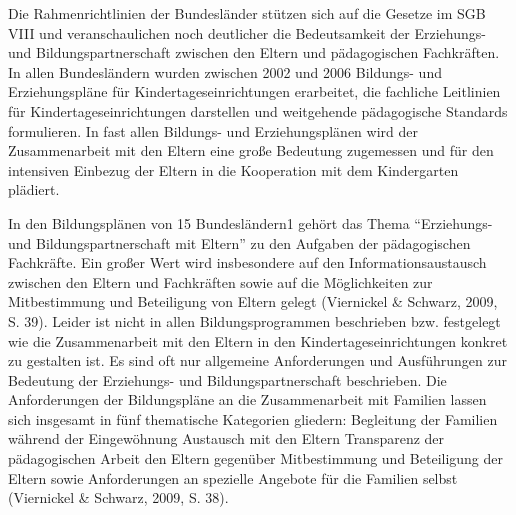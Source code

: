 \documentclass[12pt,a4paper]{article}
\begin{document}
	Die Rahmenrichtlinien der Bundesländer stützen sich auf die Gesetze im SGB VIII und veranschaulichen noch deutlicher die Bedeutsamkeit der Erziehungs- und Bildungspartnerschaft zwischen den Eltern und pädagogischen Fachkräften. In allen Bundesländern wurden zwischen 2002 und 2006 Bildungs- und Erziehungspläne für Kindertageseinrichtungen erarbeitet, die fachliche Leitlinien für Kindertageseinrichtungen darstellen und weitgehende pädagogische Standards formulieren. In fast allen Bildungs- und Erziehungsplänen wird der Zusammenarbeit mit den Eltern eine große Bedeutung zugemessen und für den intensiven Einbezug der Eltern in die Kooperation mit dem Kindergarten plädiert. 

In den Bildungsplänen von 15 Bundesländern1 gehört das Thema "`Erziehungs- und Bildungspartnerschaft mit Eltern"' zu den Aufgaben der pädagogischen Fachkräfte. Ein großer Wert wird insbesondere auf den Informationsaustausch zwischen den Eltern und Fachkräften sowie auf die Möglichkeiten zur Mitbestimmung und Beteiligung von Eltern gelegt (Viernickel \& Schwarz, 2009, S. 39). Leider ist nicht in allen Bildungsprogrammen beschrieben bzw. festgelegt wie die Zusammenarbeit mit den Eltern in den Kindertageseinrichtungen konkret zu gestalten ist. Es sind oft nur allgemeine Anforderungen und Ausführungen zur Bedeutung der Erziehungs- und Bildungspartnerschaft beschrieben. Die Anforderungen der Bildungspläne an die Zusammenarbeit mit Familien lassen sich insgesamt in fünf thematische Kategorien gliedern:
Begleitung der Familien während der Eingewöhnung
Austausch mit den Eltern  
Transparenz der  pädagogischen Arbeit den Eltern gegenüber
Mitbestimmung und Beteiligung der Eltern sowie
Anforderungen an spezielle Angebote für die Familien selbst (Viernickel \& Schwarz, 2009, S. 38).		
\end{document}
